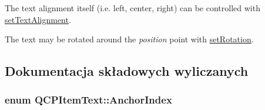 The text alignment itself (i.\+e. left, center, right) can be controlled with \hyperlink{class_q_c_p_item_text_ab5bc0684c4d1bed81949a11b34dba478}{set\+Text\+Alignment}.

The text may be rotated around the {\itshape position} point with \hyperlink{class_q_c_p_item_text_a4bcc10cd97952c3f749d75824b5077f0}{set\+Rotation}. 

\subsection{Dokumentacja składowych wyliczanych}
\subsubsection[{\texorpdfstring{Anchor\+Index}{AnchorIndex}}]{\setlength{\rightskip}{0pt plus 5cm}enum {\bf Q\+C\+P\+Item\+Text\+::\+Anchor\+Index}\hspace{0.3cm}{\ttfamily [protected]}}\hypertarget{class_q_c_p_item_text_a14a84e58f72519c8ae1d7a4a1dd23f21}{}\label{class_q_c_p_item_text_a14a84e58f72519c8ae1d7a4a1dd23f21}
